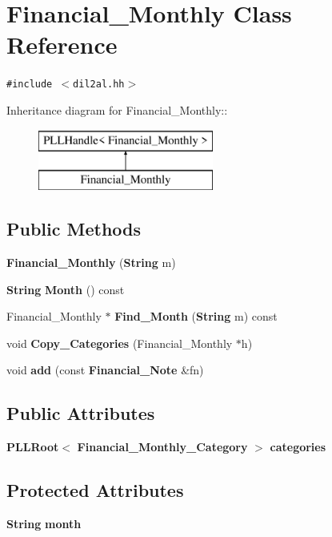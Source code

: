 \section{Financial\_\-Monthly  Class Reference}
\label{classFinancial__Monthly}
{\tt \#include $<$dil2al.hh$>$}

Inheritance diagram for Financial\_\-Monthly::\begin{figure}[H]
\begin{center}
\leavevmode
\includegraphics[height=2cm]{classFinancial__Monthly}
\end{center}
\end{figure}
\subsection*{Public Methods}
\begin{CompactItemize}
\item 
{\bf Financial\_\-Monthly} ({\bf String} m)
\item 
{\bf String} {\bf Month} () const
\item 
Financial\_\-Monthly $\ast$ {\bf Find\_\-Month} ({\bf String} m) const
\item 
void {\bf Copy\_\-Categories} (Financial\_\-Monthly $\ast$h)
\item 
void {\bf add} (const {\bf Financial\_\-Note} \&fn)
\end{CompactItemize}
\subsection*{Public Attributes}
\begin{CompactItemize}
\item 
{\bf PLLRoot}$<$ {\bf Financial\_\-Monthly\_\-Category} $>$ {\bf categories}
\end{CompactItemize}
\subsection*{Protected Attributes}
\begin{CompactItemize}
\item 
{\bf String} {\bf month}
\end{CompactItemize}


